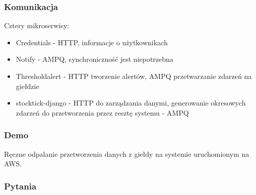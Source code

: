 \documentclass[serif,mathserif]{beamer}
\begin{document}
\begin{frame}
  \frametitle{Komunikacja}
  Cztery mikroserwisy:
  \begin{itemize}
  \item Credentials - HTTP, informacje o użytkownikach
  \item Notify - AMPQ, synchroniczność jest niepotrzebna
  \item Thresholdalert - HTTP tworzenie alertów, AMPQ przetwarzanie zdarzeń na giełdzie
  \item stocktick-django - HTTP do zarządzania danymi, generowanie okresowych zdarzeń do przetworzenia przez resztę systemu - AMPQ
  \end{itemize}
\end{frame}

\begin{frame}
  \frametitle{Demo}
  Ręczne odpalanie przetworzenia danych z giełdy na systemie uruchomionym na AWS.
\end{frame}


\begin{frame}
  \frametitle{Pytania}
\end{frame}
\end{document}
